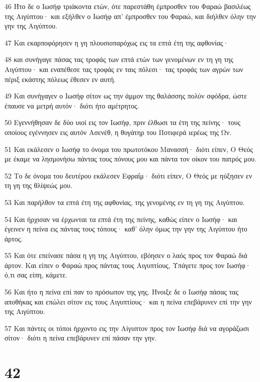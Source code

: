 \par 46 Ήτο δε ο Ιωσήφ τριάκοντα ετών, ότε παρεστάθη έμπροσθεν του Φαραώ βασιλέως της Αιγύπτου· και εξήλθεν ο Ιωσήφ απ' έμπροσθεν του Φαραώ, και διήλθεν όλην την γην της Αιγύπτου.
\par 47 Και εκαρποφόρησεν η γη πλουσιοπαρόχως εις τα επτά έτη της αφθονίας·
\par 48 και συνήγαγε πάσας τας τροφάς των επτά ετών των γενομένων εν τη γη της Αιγύπτου· και εναπέθεσε τας τροφάς εν ταις πόλεσι· τας τροφάς των αγρών των πέριξ εκάστης πόλεως έθεσεν εν αυτή.
\par 49 Και συνήγαγεν ο Ιωσήφ σίτον ως την άμμον της θαλάσσης πολύν σφόδρα, ώστε έπαυσε να μετρή αυτόν· διότι ήτο αμέτρητος.
\par 50 Εγεννήθησαν δε δύο υιοί εις τον Ιωσήφ, πριν έλθωσι τα έτη της πείνης· τους οποίους εγέννησεν εις αυτόν Ασενέθ, η θυγάτηρ του Ποτιφερά ιερέως της Ων.
\par 51 Και εκάλεσεν ο Ιωσήφ το όνομα του πρωτοτόκου Μανασσή· διότι είπεν, Ο Θεός με έκαμε να λησμονήσω πάντας τους πόνους μου και πάντα τον οίκον του πατρός μου.
\par 52 Το δε όνομα του δευτέρου εκάλεσεν Εφραΐμ· διότι είπεν, Ο Θεός με ηύξησεν εν τη γη της θλίψεώς μου.
\par 53 Και παρήλθον τα επτά έτη της αφθονίας, της γενομένης εν τη γη της Αιγύπτου.
\par 54 Και ήρχισαν να έρχωνται τα επτά έτη της πείνης, καθώς είπεν ο Ιωσήφ· και έγεινεν η πείνα εις πάντας τους τόπους· καθ' όλην όμως την γην της Αιγύπτου ήτο άρτος.
\par 55 Και ότε επείνασε πάσα η γη της Αιγύπτου, εβόησεν ο λαός προς τον Φαραώ διά άρτον. Και είπεν ο Φαραώ προς πάντας τους Αιγυπτίους, Υπάγετε προς τον Ιωσήφ· ό,τι σας είπη, κάμετε.
\par 56 Και ήτο η πείνα επί παν το πρόσωπον της γης. Ήνοιξε δε ο Ιωσήφ πάσας τας αποθήκας και επώλει σίτον εις τους Αιγυπτίους· και η πείνα επεβάρυνεν επί την γην της Αιγύπτου.
\par 57 Και πάντες οι τόποι ήρχοντο εις την Αίγυπτον προς τον Ιωσήφ διά να αγοράζωσι σίτον· διότι η πείνα επεβάρυνεν επί πάσαν την γην.

\chapter{42}

